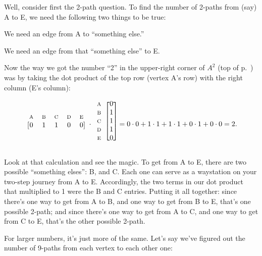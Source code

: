\begin{alttitles}
Well, consider first the 2-path question. To find the number of 2-paths from
(say) A to E, we need the following two things to be true:

\begin{compactenum}
\item We need an edge from A to ``something else.''
\item We need an edge from that ``something else'' to E.
\end{compactenum}

Now the way we got the number ``2'' in the upper-right corner of $A^2$ (top of
p.~\pageref{adjacencySquared}) was by taking the dot product of the top row
(vertex A's row) with the right column (E's column):

\[
\begin{blockarray}{ccccc}
{\scriptsize\textrm{A}} & {\scriptsize\textrm{B}} & {\scriptsize\textrm{C}} & {\scriptsize\textrm{D}} & {\scriptsize\textrm{E}} \\
\begin{block}{[ccccc]}
 0 & 1 & 1 & 0 & 0 \\
\end{block}
\end{blockarray} \cdot
\begin{blockarray}{cc}
\begin{block}{c[c]}
{\scriptsize\textrm{A}} & 0 \\
{\scriptsize\textrm{B}} & 1 \\
{\scriptsize\textrm{C}} & 1 \\
{\scriptsize\textrm{D}} & 1 \\
{\scriptsize\textrm{E}} & 0 \\
\end{block}
\end{blockarray} = 0\cdot 0 + 1\cdot 1 + 1\cdot 1 + 0\cdot 1 + 0\cdot 0 = 2.
\]

Look at that calculation and see the magic. To get from A to E, there are two
possible ``something elses'': B, and C. Each one can serve as a waystation on
your two-step journey from A to E. Accordingly, the two terms in our dot
product that multiplied to 1 were the B and C entries. Putting it all together:
since there's one way to get from A to B, and one way to get from B to E,
that's one possible 2-path; and since there's one way to get from A to C, and
one way to get from C to E, that's the other possible 2-path.

\smallskip

For larger numbers, it's just more of the same. Let's say we've figured out the
number of 9-paths from each vertex to each other one:


\end{alttitles}
